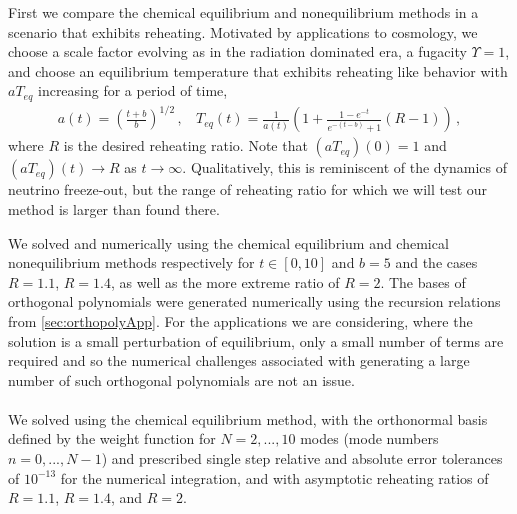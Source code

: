 First we compare the chemical equilibrium and nonequilibrium methods in a scenario that exhibits reheating.  Motivated by applications to cosmology, we choose a scale factor evolving as in the radiation dominated era, a fugacity $\Upsilon=1$, and choose an equilibrium temperature that exhibits reheating like behavior with $aT_{eq}$ increasing for a period of time,
\begin{align}\label{aTDef}
a(t)=\left(\frac{t+b}{b}\right)^{1/2}\,,\ \  \ \
T_{eq}(t)=\frac{1}{a(t)}\left(1+\frac{1-e^{-t}}{e^{-(t-b)}+1}(R-1)\right)\,,
\end{align}
where $R$ is the desired reheating ratio. Note that $(aT_{eq})(0)=1$ and $(aT_{eq})(t)\rightarrow R$ as $t\rightarrow\infty$. Qualitatively, this is reminiscent of the dynamics of neutrino freeze-out, but the range of reheating ratio for which we will test our method is larger than found there.

We solved  and  numerically using the chemical equilibrium and chemical nonequilibrium methods respectively for $t\in[0,10]$ and $b=5$ and the cases $R=1.1$, $R=1.4$, as well as the more extreme ratio of $R=2$.  The bases of orthogonal polynomials were generated numerically using the recursion relations from \ref{sec:orthopolyApp}.  For the applications we are considering, where the solution is a small perturbation of equilibrium, only a small number of terms are required and so the numerical challenges associated with generating a large number of such orthogonal polynomials are not an issue.\\

\\
We solved  using the chemical equilibrium method, with the orthonormal basis defined by the weight function  for $N=2,...,10$ modes (mode numbers $n=0,...,N-1$) and prescribed  single step relative and absolute error tolerances of $10^{-13}$ for the numerical integration, and with asymptotic reheating ratios of $R=1.1$, $R=1.4$, and $R=2$.   




